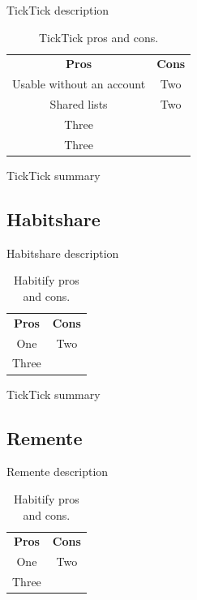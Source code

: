 TickTick description

\begin{table}[h!]
    \centering
    \begin{ctucolortab}
        \begin{tabular}{cc}
            \bfseries Pros & \bfseries Cons\\\Midrule
            Usable without an account & Two\\
            Shared lists & Two\\
            Three & \\
            Three & \\
        \end{tabular}
    \end{ctucolortab}
    \caption{TickTick pros and cons.}\label{tab:tickTick-pros-cons}
\end{table}

TickTick summary


\subsection{Habitshare}\label{subsec:habitshare}

Habitshare description

\begin{table}[h!]
    \centering
    \begin{ctucolortab}
        \begin{tabular}{cc}
            \bfseries Pros & \bfseries Cons\\\Midrule
            One & Two\\
            Three & \\
        \end{tabular}
    \end{ctucolortab}
    \caption{Habitify pros and cons.}\label{tab:habitshare-pros-cons}
\end{table}

TickTick summary


\subsection{Remente}\label{subsec:remente}

Remente description

\begin{table}[h!]
    \centering
    \begin{ctucolortab}
        \begin{tabular}{cc}
            \bfseries Pros & \bfseries Cons\\\Midrule
            One & Two\\
            Three & \\
        \end{tabular}
    \end{ctucolortab}
    \caption{Habitify pros and cons.}\label{tab:remente-pros-cons}
\end{table}


